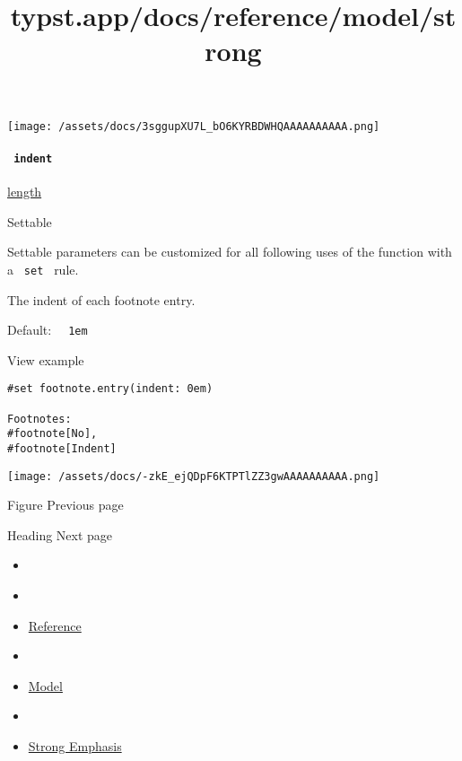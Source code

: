 \texttt{[image: /assets/docs/3sggupXU7L\_bO6KYRBDWHQAAAAAAAAAA.png]}

\paragraph{\texorpdfstring{\texttt{\ indent\ }}{ indent }}\label{definitions-entry-indent}

\href{/docs/reference/layout/length/}{length}

{{ Settable }}

\label{definitions-entry-indent-settable-tooltip}
Settable parameters can be customized for all following uses of the
function with a \texttt{\ set\ } rule.

The indent of each footnote entry.

Default: \texttt{\ }{\texttt{\ 1em\ }}\texttt{\ }


View example

\begin{verbatim}
#set footnote.entry(indent: 0em)

Footnotes:
#footnote[No],
#footnote[Indent]
\end{verbatim}

\texttt{[image: /assets/docs/-zkE\_ejQDpF6KTPTlZZ3gwAAAAAAAAAA.png]}

\href{/docs/reference/model/figure/}{\pandocbounded{}}

{ Figure } { Previous page }

\href{/docs/reference/model/heading/}{\pandocbounded{}}

{ Heading } { Next page }


\title{typst.app/docs/reference/model/strong}

\begin{itemize}
\tightlist
\item
  \href{/docs}{}
\item
  
\item
  \href{/docs/reference/}{Reference}
\item
  
\item
  \href{/docs/reference/model/}{Model}
\item
  
\item
  \href{/docs/reference/model/strong/}{Strong Emphasis}
\end{itemize}

